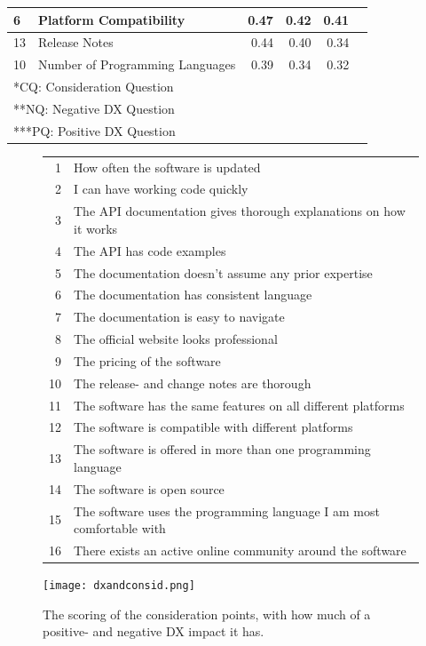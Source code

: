 \documentclass{cslthse-msc}
\begin{document}
\begin{table}[H]
\begin{tabularx}{\columnwidth}{l|X r r r r}
            6   & Platform Compatibility	&	0.47	&	0.42	&	0.41	&	\pm 0.01	\\ \hline
            13 & Release Notes	&	0.44	&	0.40	&	0.34	&	\pm 0.06	\\ \hline
            10 & Number of Programming Languages	&	0.39	&	0.34	&	0.32	&	\pm 0.02	\\ \hline \hline
            \multicolumn{5}{l}{*CQ: Consideration Question}\\
            \multicolumn{5}{l}{**NQ: Negative DX Question}\\
            \multicolumn{5}{l}{***PQ: Positive DX Question}\\
        \end{tabularx}
    \end{table}


    \begin{figure}[H]
        \centering
        \begin{tabular}{r l}
            \hline
            1    & How often the software is updated    \\
            2    & I can have working code quickly  \\
            3    & The API documentation gives thorough explanations on how it works    \\
            4    & The API has code examples    \\
            5    & The documentation doesn't assume any prior expertise \\
            6    & The documentation has consistent language    \\
            7    & The documentation is easy to navigate    \\
            8    & The official website looks professional  \\
            9    & The pricing of the software  \\
            10    &  The release- and change notes are thorough \\
            11   &  The software has the same features on all different platforms   \\
            12    &  The software is compatible with different platforms    \\
            13  &  The software is offered in more than one programming language    \\
            14    &  The software is open source    \\
            15    &  The software uses the programming language I am most comfortable with  \\
            16    &  There exists an active online community around the software    \\ \hline
        \end{tabular}
        \hspace*{-0.01\textwidth}\texttt{[image: dxandconsid.png]}
        \caption{The scoring of the consideration points, with how much of a positive- and negative DX impact it has.}
        \label{fig:dxandcosnid}
    \end{figure}
\end{document}
